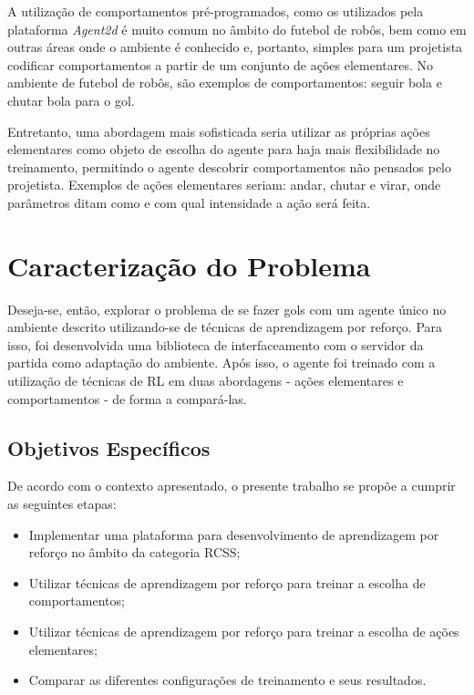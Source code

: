 A utilização de comportamentos pré-programados, como os utilizados pela plataforma \textit{Agent2d} é muito comum no âmbito do futebol de robôs, bem como em outras áreas onde o ambiente é conhecido e, portanto, simples para um projetista codificar comportamentos a partir de um conjunto de ações elementares. No ambiente de futebol de robôs, são exemplos de comportamentos: seguir bola e chutar bola para o gol.

Entretanto, uma abordagem mais sofisticada seria utilizar as próprias ações elementares como objeto de escolha do agente para haja mais flexibilidade no treinamento, permitindo o agente descobrir comportamentos não pensados pelo projetista. Exemplos de ações elementares seriam: andar, chutar e virar, onde parâmetros ditam como e com qual intensidade a ação será feita.


\section{Caracterização do Problema}

Deseja-se, então, explorar o problema de se fazer gols com um agente único no ambiente descrito utilizando-se de técnicas de aprendizagem por reforço. Para isso, foi desenvolvida uma biblioteca de interfaceamento com o servidor da partida como adaptação do ambiente. Após isso, o agente foi treinado com a utilização de técnicas de RL em duas abordagens - ações elementares e comportamentos - de forma a compará-las.


\subsection{Objetivos Específicos}
\par De acordo com o contexto apresentado, o presente trabalho se propõe a cumprir as seguintes etapas:
\begin{itemize}
	\item Implementar uma plataforma para desenvolvimento de aprendizagem por reforço no âmbito da categoria RCSS;
	\item Utilizar técnicas de aprendizagem por reforço para treinar a escolha de comportamentos;
	\item Utilizar técnicas de aprendizagem por reforço para treinar a escolha de ações elementares;
	\item Comparar as diferentes configurações de treinamento e seus resultados.
\end{itemize}

